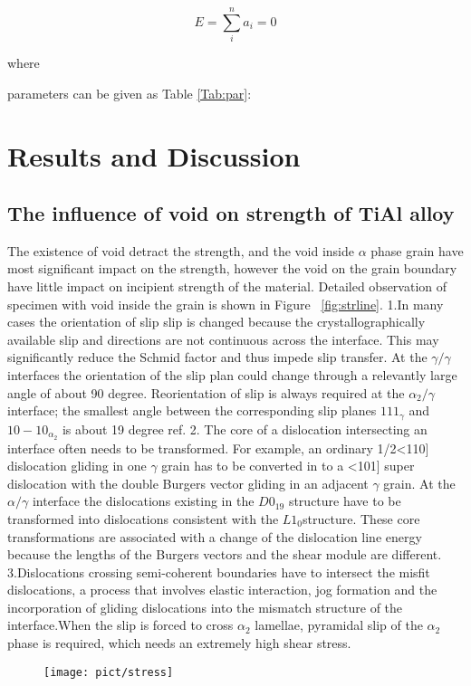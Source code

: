 \documentclass[final,5p,times,twocolumn]{elsarticle}
\begin{document}
$$E=\sum_{i}^n a_i=0$$

where


parameters can be given as Table \ref{Tab:par}:



\section{Results and Discussion}

\subsection{The influence of void on strength of TiAl alloy}

The existence of void detract the strength, and the void inside $\alpha$ phase grain have most significant  impact on the strength, however the void on the grain boundary have little impact on incipient strength of the material. Detailed observation of specimen with void inside the grain is shown in Figure ~\ref{fig:strline}.
1.In many cases the orientation of slip slip is changed because the crystallographically available slip and directions are not continuous across the interface. This may significantly reduce the Schmid factor and thus impede slip transfer. At the $\gamma/\gamma$ interfaces the orientation of the slip plan could change through a relevantly large angle of about 90 degree. Reorientation of slip is always required at the $\alpha_{2} / \gamma$ interface; the smallest angle between the corresponding slip planes ${1 1 1 }_{\gamma}$ and ${ 1 0 -1 0}_{\alpha_2}$ is about 19 degree ref{}.
2. The core of  a dislocation intersecting an interface often needs to be transformed. For example, an ordinary 1/2<110] dislocation gliding in one $\gamma$ grain has to be converted in to a <101] super dislocation with the double Burgers vector gliding in an adjacent $\gamma$ grain. At the $\alpha/\gamma$ interface the dislocations existing in the $D0_{19}$ structure have to be transformed into dislocations consistent with the $L1_0$structure. These core transformations are associated with a change of the dislocation line energy because the lengths of the Burgers vectors and the shear module are different.
3.Dislocations crossing semi-coherent boundaries have to intersect the misfit dislocations, a process that involves elastic interaction, jog formation and the incorporation of gliding dislocations into the mismatch structure of the interface.When the slip is forced to cross $\alpha_2$ lamellae, pyramidal slip of the $\alpha_2$ phase is required, which needs an extremely high shear stress.
\begin{figure}
	\centering
	\texttt{[image: pict/stress]}
	\caption{}
	\centering
	\label{fig:stress}
\end{figure}
\end{document}
